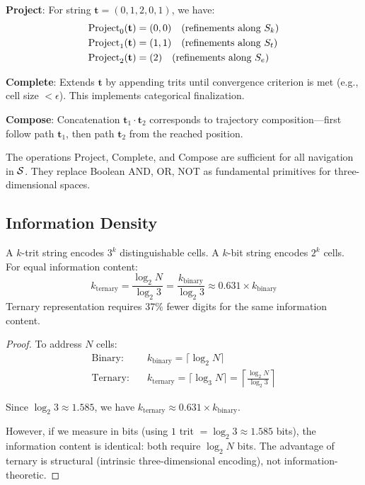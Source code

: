 \textbf{Project}: For string $\mathbf{t} = (0,1,2,0,1)$, we have:
\begin{align}
\text{Project}_0(\mathbf{t}) &= (0, 0) \quad \text{(refinements along } S_k \text{)} \\
\text{Project}_1(\mathbf{t}) &= (1, 1) \quad \text{(refinements along } S_t \text{)} \\
\text{Project}_2(\mathbf{t}) &= (2) \quad \text{(refinements along } S_e \text{)}
\end{align}

\textbf{Complete}: Extends $\mathbf{t}$ by appending trits until convergence criterion is met (e.g., cell size $< \epsilon$). This implements categorical finalization.

\textbf{Compose}: Concatenation $\mathbf{t}_1 \cdot \mathbf{t}_2$ corresponds to trajectory composition—first follow path $\mathbf{t}_1$, then path $\mathbf{t}_2$ from the reached position.

\begin{proposition}
\label{prop:operational}
The operations Project, Complete, and Compose are sufficient for all navigation in $\mathcal{S}$. They replace Boolean AND, OR, NOT as fundamental primitives for three-dimensional spaces.
\end{proposition}

\subsection{Information Density}

\begin{proposition}
\label{prop:density}
A $k$-trit string encodes $3^k$ distinguishable cells. A $k$-bit string encodes $2^k$ cells. For equal information content:
\begin{equation}
k_{\text{ternary}} = \frac{\log_2 N}{\log_2 3} = \frac{k_{\text{binary}}}{\log_2 3} \approx 0.631 \times k_{\text{binary}}
\end{equation}
Ternary representation requires 37\% fewer digits for the same information content.
\end{proposition}

\begin{proof}
To address $N$ cells:
\begin{align}
\text{Binary:} \quad & k_{\text{binary}} = \lceil \log_2 N \rceil \\
\text{Ternary:} \quad & k_{\text{ternary}} = \lceil \log_3 N \rceil = \left\lceil \frac{\log_2 N}{\log_2 3} \right\rceil
\end{align}

Since $\log_2 3 \approx 1.585$, we have $k_{\text{ternary}} \approx 0.631 \times k_{\text{binary}}$.

However, if we measure in bits (using $1$ trit $= \log_2 3 \approx 1.585$ bits), the information content is identical: both require $\log_2 N$ bits. The advantage of ternary is structural (intrinsic three-dimensional encoding), not information-theoretic.
\end{proof}

